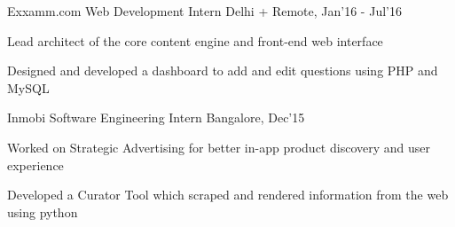 \begin{cventries}
	\cventry
	{Exxamm.com}
	{Web Development Intern}
	{Delhi + Remote, Jan'16 - Jul'16}
	{}
	{}
	{
		\begin{cvitems}
		\item Lead architect of the core content engine and front-end web interface
		\item Designed and developed a dashboard to add and edit questions using PHP and MySQL
		\end{cvitems}
	}

	\cventry
	{Inmobi}
	{Software Engineering Intern}
	{Bangalore, Dec'15}
	{}
	{}
	{
		\begin{cvitems}
		\item Worked on Strategic Advertising for better in-app product discovery and user experience
		\item Developed a Curator Tool which scraped and rendered information from the web using python
		\end{cvitems}
	}

\end{cventries}

